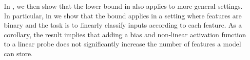 \documentclass[11pt]{article}
\begin{document}
In , we then show that the lower bound in  also applies to more general settings. In particular, in  we show that the bound applies in a setting where features are binary and the task is to linearly classify inputs according to each feature. As a corollary, the result implies that adding a bias and non-linear activation function to a linear probe does not significantly increase the number of features a model can store.
\end{document}
